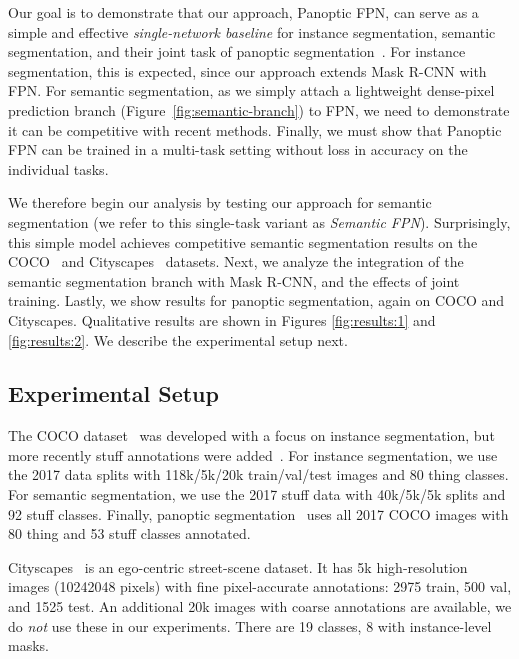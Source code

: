 \documentclass[10pt,twocolumn,letterpaper]{article}
\makeatletter
\newcommand{\x}{}
\renewcommand\paragraph{\@startsection{paragraph}{4}{\z@}{.5em \@plus1ex \@minus.1ex}{-.5em}{\normalfont\normalsize\bfseries}}
\makeatother
\begin{document}
{Our goal is to demonstrate that our approach, Panoptic FPN, can serve as a simple and effective \emph{single-network baseline} for instance segmentation, semantic segmentation, and their joint task of panoptic segmentation~\cite{kirillov2017panoptic}. For instance segmentation, this is expected, since our approach extends Mask R-CNN with FPN. For semantic segmentation, as we simply attach a lightweight dense-pixel prediction branch (Figure~\ref{fig:semantic-branch}) to FPN, we need to demonstrate it can be competitive with recent methods. Finally, we must show that Panoptic FPN can be trained in a multi-task setting without loss in accuracy on the individual tasks.

We therefore begin our analysis by testing our approach for semantic segmentation (we refer to this single-task variant as \emph{Semantic FPN}). Surprisingly, this simple model achieves competitive semantic segmentation results on the COCO~\cite{lin2014coco} and Cityscapes~\cite{Cordts2016Cityscapes} datasets. Next, we analyze the integration of the semantic segmentation branch with Mask R-CNN, and the effects of joint training. Lastly, we show results for panoptic segmentation, again on COCO and Cityscapes. Qualitative results are shown in Figures \ref{fig:results:1} and \ref{fig:results:2}. We describe the experimental setup next.

\subsection{Experimental Setup}

\paragraph{COCO:} The COCO dataset~\cite{lin2014coco} was developed with a focus on instance segmentation, but more recently stuff annotations were added~\cite{caesar2016coco}. For instance segmentation, we use the 2017 data splits with 118k/5k/20k train/val/test images and 80 thing classes. For semantic segmentation, we use the 2017 stuff data with 40k/5k/5k splits and 92 stuff classes. Finally, panoptic segmentation~\cite{kirillov2017panoptic} uses all 2017 COCO images with 80 thing and 53 stuff classes annotated.

\paragraph{Cityscapes:} Cityscapes~\cite{Cordts2016Cityscapes} is an ego-centric street-scene dataset. It has 5k high-resolution images (1024\x2048 pixels) with fine pixel-accurate annotations: 2975 train, 500 val, and 1525 test. An additional 20k images with coarse annotations are available, we do \emph{not} use these in our experiments. There are 19 classes, 8 with instance-level masks.

}
\end{document}
